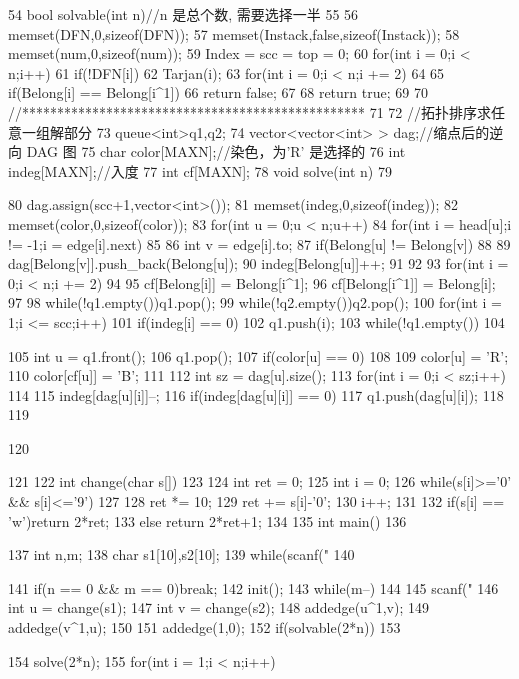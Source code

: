 \documentclass[11pt]{article}
\begin{document}
\begin{Code}
 54   bool solvable(int n)//n 是总个数, 需要选择一半
 55   {
 56       memset(DFN,0,sizeof(DFN));
 57       memset(Instack,false,sizeof(Instack));
 58       memset(num,0,sizeof(num));
 59       Index = scc = top = 0;
 60       for(int i = 0;i < n;i++)
 61           if(!DFN[i])
 62               Tarjan(i);
 63       for(int i = 0;i < n;i += 2)
 64       {
 65           if(Belong[i] == Belong[i^1])
 66               return false;
 67       }
 68       return true;
 69   }
 70   //*************************************************
 71
 72   //拓扑排序求任意一组解部分
 73   queue<int>q1,q2;
 74   vector<vector<int> > dag;//缩点后的逆向 DAG 图
 75   char color[MAXN];//染色，为'R' 是选择的
 76   int indeg[MAXN];//入度
 77   int cf[MAXN];
 78   void solve(int n)
 79   {
 80       dag.assign(scc+1,vector<int>());
 81       memset(indeg,0,sizeof(indeg));
 82       memset(color,0,sizeof(color));
 83       for(int u = 0;u < n;u++)
 84           for(int i = head[u];i != -1;i = edge[i].next)
 85           {
 86               int v = edge[i].to;
 87               if(Belong[u] != Belong[v])
 88               {
 89                   dag[Belong[v]].push_back(Belong[u]);
 90                   indeg[Belong[u]]++;
 91               }
 92           }
 93       for(int i = 0;i < n;i += 2)
 94       {
 95           cf[Belong[i]] = Belong[i^1];
 96           cf[Belong[i^1]] = Belong[i];
 97       }
 98       while(!q1.empty())q1.pop();
 99       while(!q2.empty())q2.pop();
100       for(int i = 1;i <= scc;i++)
101           if(indeg[i] == 0)
102               q1.push(i);
103       while(!q1.empty())
104       {


105              int u = q1.front();
106              q1.pop();
107              if(color[u] == 0)
108              {
109                  color[u] = 'R';
110                  color[cf[u]] = 'B';
111              }
112              int sz = dag[u].size();
113              for(int i = 0;i < sz;i++)
114              {
115                  indeg[dag[u][i]]--;
116                  if(indeg[dag[u][i]] == 0)
117                      q1.push(dag[u][i]);
118              }
119       }
120   }
121
122   int change(char s[])
123   {
124       int ret = 0;
125       int i = 0;
126       while(s[i]>='0' && s[i]<='9')
127       {
128           ret *= 10;
129           ret += s[i]-'0';
130           i++;
131       }
132       if(s[i] == 'w')return 2*ret;
133       else return 2*ret+1;
134   }
135   int main()
136   {
137       int n,m;
138       char s1[10],s2[10];
139       while(scanf("%
140       {
141           if(n == 0 && m == 0)break;
142           init();
143           while(m--)
144           {
145                scanf("%
146                int u = change(s1);
147                int v = change(s2);
148                addedge(u^1,v);
149                addedge(v^1,u);
150           }
151           addedge(1,0);
152           if(solvable(2*n))
153           {
154                solve(2*n);
155                for(int i = 1;i < n;i++)


}}}
\end{Code}
\end{document}
